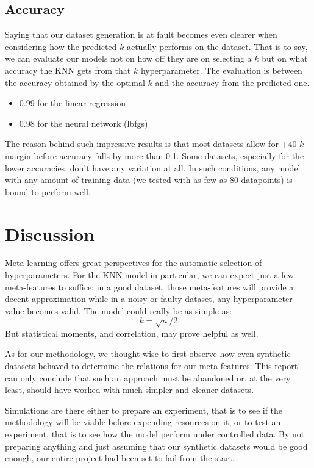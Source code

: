 \documentclass[a4paper,11pt]{article}
\begin{document}
\subsection{Accuracy}
Saying that our dataset generation is at fault becomes even clearer when considering how the predicted \(k\) actually performs on the dataset. That is to say, we can evaluate our models not on how off they are on selecting a \(k\) but on what accuracy the KNN gets from that \(k\) hyperparameter. The evaluation is between the accuracy obtained by the optimal \(k\) and the accuracy from the predicted one. 
\begin{itemize}
    \item 0.99 for the linear regression
    \item 0.98 for the neural network (lbfgs)
\end{itemize}
The reason behind such impressive results is that most datasets allow for +40 \(k\) margin before accuracy falls by more than 0.1. Some datasets, especially for the lower accuracies, don't have any variation at all. In such conditions, any model with any amount of training data (we tested with as few as 80 datapoints) is bound to perform well.

\section{Discussion}
Meta-learning offers great perspectives for the automatic selection of hyperparameters. For the KNN model in particular, we can expect just a few meta-features to suffice: in a good dataset, those meta-features will provide a decent approximation while in a noisy or faulty dataset, any hyperparameter value becomes valid. The model could really be as simple as:
\[
k = \sqrt{n}/2
\]
But statistical moments, and correlation, may prove helpful as well.

As for our methodology, we thought wise to first observe how even synthetic datasets behaved to determine the relations for our meta-features. This report can only conclude that such an approach must be abandoned or, at the very least, should have worked with much simpler and cleaner datasets. 

Simulations are there either to prepare an experiment, that is to see if the methodology will be viable before expending resources on it, or to test an experiment, that is to see how the model perform under controlled data. By not preparing anything and just assuming that our synthetic datasets would be good enough, our entire project had been set to fail from the start.
\end{document}

